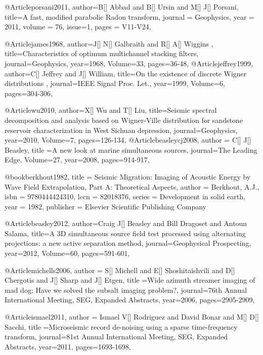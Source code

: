 @Article{porsani2011,
  author={B[] Abbad and B[] Ursin and M[] J[] Porsani},
  title={A fast, modified parabolic Radon transform},
  journal = 	 {Geophysics},
  year = 	 2011,
  volume =	 76,
  issue=1,
  pages =	 {V11-V24},
}



@Article{james1968,
  author={J[] N[] Galbraith and R[] A[] Wiggins },
  title={Characteristics of optimum multichannel stacking filters},
  journal={Geophysics},
  year=1968,
  Volume=33,
  pages={36-48},
}
@Article{jeffrey1999,
  author={C[] Jeffrey and J[] William},
  title={On the existence of discrete Wigner distributions
},
  journal={IEEE Signal Proc. Let.},
  year=1999,
  Volume=6,
  pages={304-306},
}

@Article{wu2010,
  author={X[] Wu and T[] Liu},
  title={Seismic spectral decomposition and analysis based on Wigner-Ville distribution for sandstone reservoir characterization in West Sichuan depression},
  journal={Geophysics},
  year=2010,
  Volume=7,
  pages={126-134},
}
@Article{beasleycj2008,
  author = {C[] J[] Beasley},
  title ={A new look at marine simultaneous sources},
  journal={The Leading Edge},
  Volume=27,
  year=2008,
  pages={914-917},
}

@book{berkhout1982,
title     = {Seismic Migration: Imaging of Acoustic Energy by Wave Field Extrapolation, Part A: Theoretical Aspects},
author    = {Berkhout, A.J.},
isbn      = {9780444424310},
lccn      = {82018376},
series    = {Development in solid earth},
year      = {1982},
publisher = {Elsevier Scientific Publishing Company}
}

@Article{beasley2012,
  author={Craig J[] Beasley and Bill Dragoset and Antoun Salama},
  title={A 3{D} simultaneous source field test processed using alternating projections: a new active separation method},
  journal={Geophysical Prospecting},
  year=2012,
  Volume=60,
  pages={591-601},
}

@Article{michells2006,
  author = {S[] Michell and E[] Shoshitaishvili and D[] Chergotis and J[] Sharp and J[] Etgen},
  title ={Wide azimuth streamer imaging of mad dog; Have we solved the subsalt imaging problem?},
  journal={76th Annual International Meeting, SEG, Expanded Abstracts},
  year=2006,
  pages={2905-2909},
}

@Article{ismael2011,
  author = {Ismael V[] Rodriguez and David Bonar and M[] D[] Sacchi},
  title ={Microseismic record de-noising using a sparse time-frequency transform},
  journal={81st Annual International Meeting, SEG, Expanded Abstracts},
  year=2011,
  pages={1693-1698},
}

